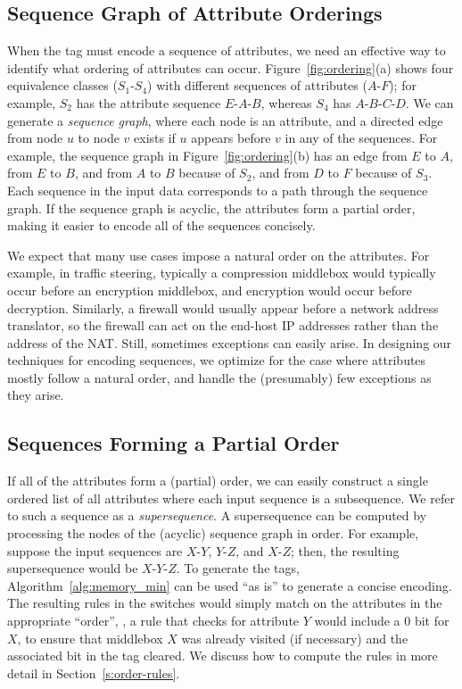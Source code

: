 \subsection{Sequence Graph of Attribute Orderings}
When the tag must encode a sequence of attributes, we need an effective
way to identify what {ordering} of attributes can occur.
Figure~\ref{fig:ordering}(a) shows four equivalence classes
($S_1$-$S_4$) with different sequences of attributes ($A$-$F$); for
example, $S_2$ has the attribute sequence $E$-$A$-$B$, whereas $S_4$ has
$A$-$B$-$C$-$D$.  We can generate a \emph{sequence graph}, where each
node is an attribute, and a directed edge from node $u$ to node $v$
exists if $u$ appears before $v$ in any of the sequences.  For example,
the sequence graph in Figure~\ref{fig:ordering}(b) has an edge from $E$
to $A$,  
from $E$ to $B$, and from $A$ to $B$ because of $S_2$, and from $D$ to $F$ because of $S_3$.  Each sequence in the input data corresponds to a path through the sequence graph.  If the sequence graph is acyclic, the attributes form a partial order, making it easier to encode all of the sequences concisely.

We expect that many use cases impose a natural order on the attributes.  For example, in traffic steering, typically a compression middlebox would typically occur before an encryption middlebox, and encryption would occur before decryption.  Similarly, a firewall would usually appear before a network address translator, so the firewall can act on the end-host IP addresses rather than the address of the NAT.  Still, sometimes exceptions can easily arise.  In designing our techniques for encoding sequences, we optimize for the case where attributes mostly follow a natural order, and handle the (presumably) few exceptions as they arise.

\subsection{Sequences Forming a Partial Order}
If all of the attributes form a (partial) order, we can easily construct a single ordered list of all attributes where each input sequence is a subsequence. We refer to such a sequence as a \emph{supersequence}.  A supersequence can be computed by processing the nodes of the (acyclic) sequence graph in order. For example, suppose the input sequences are $X$-$Y$, $Y$-$Z$, and $X$-$Z$; then, the resulting supersequence would be $X$-$Y$-$Z$. To generate the tags, Algorithm~\ref{alg:memory_min} can be used ``as is'' to generate a concise encoding.  The resulting rules in the switches would simply match on the attributes in the appropriate ``order'', \eg, a rule that checks for attribute $Y$ would include a $0$ bit for $X$, to ensure that middlebox $X$ was already visited (if necessary) and the associated bit in the tag cleared.  We discuss how to compute the rules in more detail in Section~\ref{s:order-rules}.

